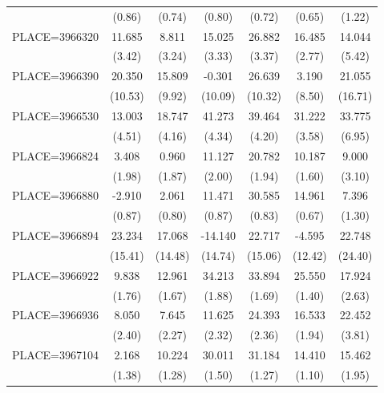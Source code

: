 {\begin{tabular}{l*{6}{c}}
                    &      (0.86)&      (0.74)&      (0.80)&      (0.72)&      (0.65)&      (1.22)\\
PLACE=3966320       &      11.685&       8.811&      15.025&      26.882&      16.485&      14.044\\
                    &      (3.42)&      (3.24)&      (3.33)&      (3.37)&      (2.77)&      (5.42)\\
PLACE=3966390       &      20.350&      15.809&      -0.301&      26.639&       3.190&      21.055\\
                    &     (10.53)&      (9.92)&     (10.09)&     (10.32)&      (8.50)&     (16.71)\\
PLACE=3966530       &      13.003&      18.747&      41.273&      39.464&      31.222&      33.775\\
                    &      (4.51)&      (4.16)&      (4.34)&      (4.20)&      (3.58)&      (6.95)\\
PLACE=3966824       &       3.408&       0.960&      11.127&      20.782&      10.187&       9.000\\
                    &      (1.98)&      (1.87)&      (2.00)&      (1.94)&      (1.60)&      (3.10)\\
PLACE=3966880       &      -2.910&       2.061&      11.471&      30.585&      14.961&       7.396\\
                    &      (0.87)&      (0.80)&      (0.87)&      (0.83)&      (0.67)&      (1.30)\\
PLACE=3966894       &      23.234&      17.068&     -14.140&      22.717&      -4.595&      22.748\\
                    &     (15.41)&     (14.48)&     (14.74)&     (15.06)&     (12.42)&     (24.40)\\
PLACE=3966922       &       9.838&      12.961&      34.213&      33.894&      25.550&      17.924\\
                    &      (1.76)&      (1.67)&      (1.88)&      (1.69)&      (1.40)&      (2.63)\\
PLACE=3966936       &       8.050&       7.645&      11.625&      24.393&      16.533&      22.452\\
                    &      (2.40)&      (2.27)&      (2.32)&      (2.36)&      (1.94)&      (3.81)\\
PLACE=3967104       &       2.168&      10.224&      30.011&      31.184&      14.410&      15.462\\
                    &      (1.38)&      (1.28)&      (1.50)&      (1.27)&      (1.10)&      (1.95)\\

\end{tabular}}
